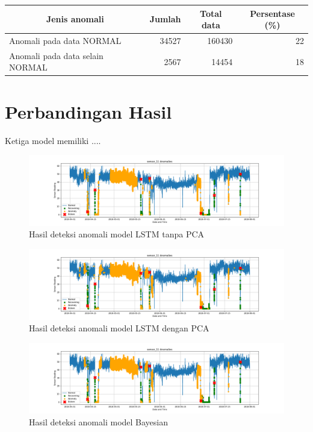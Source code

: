 \begin{table}[h]
    \centering
    \begin{tabular}{|l|r|r|r|}
        \hline
        \multicolumn{1}{|c|}{\textbf{Jenis anomali}} & \multicolumn{1}{c|}{\textbf{Jumlah}} & \multicolumn{1}{c|}{\textbf{Total data}} & \multicolumn{1}{c|}{\textbf{Persentase (\%)}} \\ \hline
        Anomali pada data NORMAL                     & 34527                                & 160430                                   & 22                                       \\ \hline
        Anomali pada data selain NORMAL              & 2567                                 & 14454                                    & 18                                       \\ \hline
    \end{tabular}
\end{table}

\section{Perbandingan Hasil}
Ketiga model memiliki ....

\begin{figure}[h]
    \centerline{\includegraphics[width=1.4\textwidth]{resources/LSTM/LSTM_noPCA_sensor_11.png}}
    \caption{Hasil deteksi anomali model LSTM tanpa PCA}
\end{figure}
\begin{figure}[h]
    \centerline{\includegraphics[width=1.4\textwidth]{resources/LSTM/LSTM_PCA_sensor_11.png}}
    \caption{Hasil deteksi anomali model LSTM dengan PCA}
\end{figure}
\begin{figure}[h]
    \centerline{\includegraphics[width=1.4\textwidth]{resources/Bayes/Bayes_sensor_11.png}}
    \caption{Hasil deteksi anomali model Bayesian}
\end{figure}
